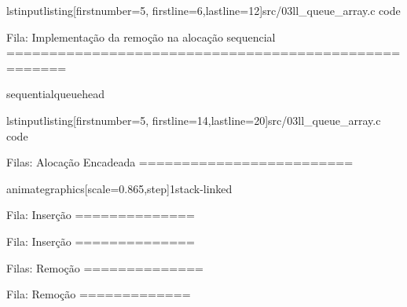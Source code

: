 lstinputlisting[firstnumber=5, firstline=6,lastline=12]{src/03ll_queue_array.c}
code

Fila: Implementação da remoção na alocação sequencial
=====================================================

sequentialqueuehead

lstinputlisting[firstnumber=5, firstline=14,lastline=20]{src/03ll_queue_array.c}
code

Filas: Alocação Encadeada
=========================

animategraphics[scale=0.865,step]{1}{stack-linked}{}{}


Fila: Inserção
==============




Fila: Inserção
==============

 
 

Filas: Remoção
==============

 
 


Fila: Remoção
=============




